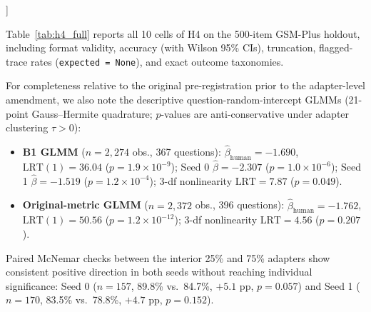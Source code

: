 \documentclass[11pt]{article}
\begin{document}
{\begin{tabular*}{\textwidth}{@{\extracolsep{\fill}}lrlrrrrrrrrrrrrrr@{}}
\bottomrule
\end{tabular*}
\label{tab:h4_full}
\endgroup
\vspace{10pt}
}]

Table~\ref{tab:h4_full} reports all 10 cells of H4 on the 500-item GSM-Plus holdout, including format validity, accuracy (with Wilson 95\% CIs), truncation, flagged-trace rates (\texttt{expected = None}), and exact outcome taxonomies.

For completeness relative to the original pre-registration prior to the adapter-level amendment, we also note the descriptive question-random-intercept GLMMs (21-point Gauss--Hermite quadrature; $p$-values are anti-conservative under adapter clustering $\tau > 0$):
\begin{itemize}
    \setlength{\itemsep}{2pt}
    \item \textbf{B1 GLMM} ($n=2{,}274$ obs., 367 questions): $\hat\beta_{\text{human}} = -1.690$, $\text{LRT}(1) = 36.04$ ($p = 1.9\times 10^{-9}$); Seed 0 $\hat\beta = -2.307$ ($p = 1.0\times 10^{-6}$); Seed 1 $\hat\beta = -1.519$ ($p = 1.2\times 10^{-4}$); 3-df nonlinearity $\text{LRT} = 7.87$ ($p = 0.049$).
    \item \textbf{Original-metric GLMM} ($n=2{,}372$ obs., 396 questions): $\hat\beta_{\text{human}} = -1.762$, $\text{LRT}(1) = 50.56$ ($p = 1.2\times 10^{-12}$); 3-df nonlinearity $\text{LRT} = 4.56$ ($p = 0.207$).
\end{itemize}
Paired McNemar checks between the interior 25\% and 75\% adapters show consistent positive direction in both seeds without reaching individual significance: Seed 0 ($n=157$, 89.8\% vs.\ 84.7\%, $+5.1$ pp, $p=0.057$) and Seed 1 ($n=170$, 83.5\% vs.\ 78.8\%, $+4.7$ pp, $p=0.152$).

\newpage
\end{document}
